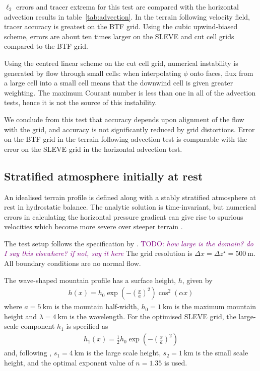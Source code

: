\documentclass{ametsoc}
\newcommand{\TODO}[1]{\textcolor{purple}{TODO: \emph{#1}}}
\begin{document}
$\ell_2$ errors and tracer extrema for this test are compared with the horizontal advection results in table~\ref{tab:advection}.  In the terrain following velocity field, tracer accuracy is greatest on the BTF grid.  Using the cubic upwind-biased scheme, errors are about ten times larger on the SLEVE and cut cell grids compared to the BTF grid.

Using the centred linear scheme on the cut cell grid, numerical instability is generated by flow through small cells: when interpolating \(\phi\) onto faces, flux from a large cell into a small cell means that the downwind cell is given greater weighting.  The maximum Courant number is less than one in all of the advection tests, hence it is not the source of this instability.

We conclude from this test that accuracy depends upon alignment of the flow with the grid, and accuracy is not significantly reduced by grid distortions.  Error on the BTF grid in the terrain following advection test is comparable with the error on the SLEVE grid in the horizontal advection test.

\subsection{Stratified atmosphere initially at rest}
\label{sec:resting}

An idealised terrain profile is defined along with a stably stratified atmosphere at rest in hydrostatic balance.  The analytic solution is time-invariant, but numerical errors in calculating the horizontal pressure gradient can give rise to spurious velocities which become more severe over steeper terrain \citep{klemp2011}.

The test setup follows the specification by \cite{klemp2011}.  \TODO{how large is the domain? do I say this elsewhere? if not, say it here} The grid resolution is \(\Delta x = \Delta z^\star = \SI{500}{\meter}\).  All boundary conditions are no normal flow.

The wave-shaped mountain profile has a surface height, $h$, given by
\begin{align}
	h(x) = h_0 \exp \left( - \left( \frac{x}{a} \right)^2 \right) \cos^2 \left( \alpha x \right) \label{eqn:resting:mountain}
\end{align}
where $a = \SI{5}{\kilo\meter}$ is the mountain half-width, $h_0 = \SI{1}{\kilo\meter}$ is the maximum mountain height and $\lambda = \SI{4}{\kilo\meter}$ is the wavelength.  For the optimised SLEVE grid, the large-scale component $h_1$ is specified as
\begin{align}
h_1(x) = \frac{1}{2} h_0 \exp \left( - \left( \frac{x}{a} \right)^2 \right)
\end{align}
and, following \cite{leuenberger2010}, $s_1 = \SI{4}{\kilo\meter}$ is the large scale height, $s_2 = \SI{1}{\kilo\meter}$ is the small scale height, and the optimal exponent value of $n = 1.35$ is used.
\end{document}
